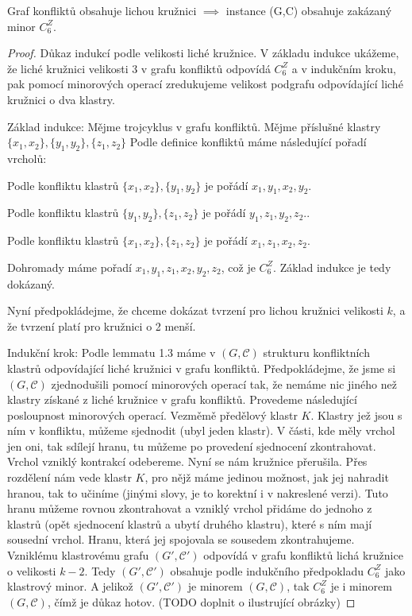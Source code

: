 \begin{tvr}
\label{lich_kruz}
Graf konfliktů obsahuje lichou kružnici $\implies$ instance (G,C) obsahuje zakázaný minor $C_6^Z$.
\end{tvr}
\begin{proof}
Důkaz indukcí podle velikosti liché kružnice. V základu indukce ukážeme, že liché kružnici velikosti 3 v grafu konfliktů odpovídá $C_6^Z$ a v indukčním kroku, pak pomocí minorových operací zredukujeme velikost podgrafu odpovídající liché kružnici o dva klastry. 

Základ indukce: Mějme trojcyklus v grafu konfliktů. Mějme příslušné klastry $\{x_1, x_2\},\{y_1, y_2\},\{z_1, z_2\}$ Podle definice konfliktů máme následující pořadí vrcholů:

Podle konfliktu klastrů $\{x_1, x_2\},\{y_1, y_2\}$ je pořádí $x_1, y_1, x_2, y_2$.

Podle konfliktu klastrů $\{y_1, y_2\},\{z_1, z_2\}$ je pořádí $y_1, z_1, y_2, z_2.$.

Podle konfliktu klastrů $\{x_1, x_2\},\{z_1, z_2\}$ je pořádí $x_1, z_1, x_2, z_2$.

Dohromady máme pořadí $x_1, y_1, z_1, x_2, y_2, z_2$, což je $C_6^Z$. Základ indukce je tedy dokázaný.

Nyní předpokládejme, že chceme dokázat tvrzení pro lichou kružnici velikosti $k$, a že tvrzení platí pro kružnici o 2 menší.

Indukční krok: Podle lemmatu 1.3 máme v $(G,\mathcal C)$ strukturu konfliktních klastrů odpovídající liché kružnici v grafu konfliktů. Předpokládejme, že jsme si $(G,\mathcal C)$ zjednodušili pomocí minorových operací tak, že nemáme nic jiného než klastry získané z liché kružnice v grafu konfliktů. Provedeme následující posloupnost minorových operací. Vezměmě předělový klastr $K$. Klastry jež jsou s ním v konfliktu, můžeme sjednodit (ubyl jeden klastr). V části, kde měly vrchol jen oni, tak sdílejí hranu, tu můžeme po provedení sjednocení zkontrahovat. Vrchol vzniklý kontrakcí odebereme. Nyní se nám kružnice přerušila. Přes rozdělení nám vede klastr $K$, pro nějž máme jedinou možnost, jak jej nahradit hranou, tak to učiníme (jinými slovy, je to korektní i v nakreslené verzi). Tuto hranu můžeme rovnou zkontrahovat a vzniklý vrchol přidáme do jednoho z klastrů (opět sjednocení klastrů a ubytí druhého klastru), které s ním mají sousední vrchol. Hranu, která jej spojovala se sousedem zkontrahujeme.  Vzniklému klastrovému grafu $(G',\mathcal C')$ odpovídá v grafu konfliktů lichá kružnice o velikosti $k-2$. Tedy $(G',\mathcal C')$ obsahuje podle indukčního předpokladu $C_6^Z$ jako klastrový minor. A jelikož $(G',\mathcal C')$ je minorem $(G,\mathcal C)$, tak $C_6^Z$ je i minorem $(G,\mathcal C)$, čímž je důkaz hotov. (TODO doplnit o ilustrující obrázky)
\end{proof}

